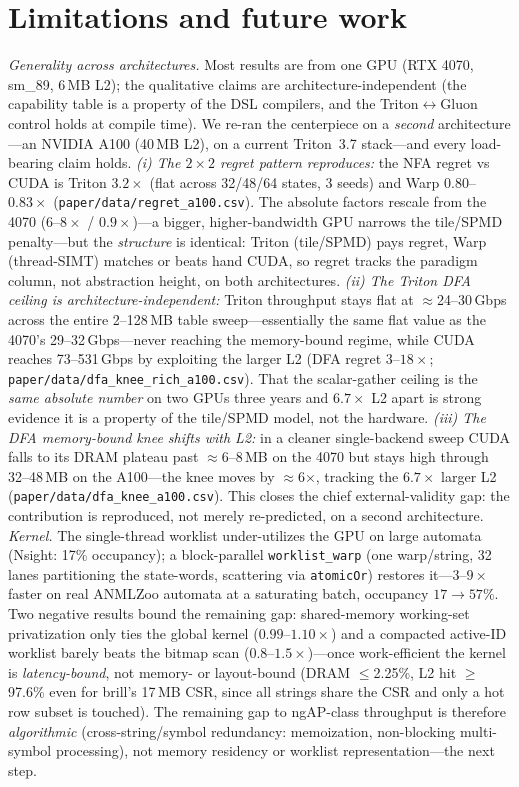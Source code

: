 \documentclass[conference]{IEEEtran}
\begin{document}
\section{Limitations and future work}\label{sec:limits}
\emph{Generality across architectures.} Most results are from one GPU (RTX 4070, sm\_89,
6\,MB L2); the qualitative claims are architecture-independent (the capability table is a
property of the DSL compilers, and the Triton$\leftrightarrow$Gluon control holds at compile
time). We re-ran the centerpiece on a \emph{second} architecture---an NVIDIA A100 (40\,MB L2),
on a current Triton~3.7 stack---and every load-bearing claim holds. \emph{(i) The $2\times2$
regret pattern reproduces:} the NFA regret vs CUDA is Triton $3.2\times$ (flat across 32/48/64
states, 3 seeds) and Warp $0.80$--$0.83\times$ (\texttt{paper/data/regret\_a100.csv}). The
absolute factors rescale from the 4070 ($6$--$8\times$ / $0.9\times$)---a bigger,
higher-bandwidth GPU narrows the tile/SPMD penalty---but the \emph{structure} is identical:
Triton (tile/SPMD) pays regret, Warp (thread-SIMT) matches or beats hand CUDA, so regret tracks
the paradigm column, not abstraction height, on both architectures. \emph{(ii) The Triton DFA
ceiling is architecture-independent:} Triton throughput stays flat at $\approx$24--30\,Gbps
across the entire 2--128\,MB table sweep---essentially the same flat value as the 4070's
29--32\,Gbps---never reaching the memory-bound regime, while CUDA reaches 73--531\,Gbps by
exploiting the larger L2 (DFA regret $3$--$18\times$; \texttt{paper/data/dfa\_knee\_rich\_a100.csv}).
That the scalar-gather ceiling is the \emph{same absolute number} on two GPUs three years and
$6.7\times$ L2 apart is strong evidence it is a property of the tile/SPMD model, not the hardware.
\emph{(iii) The DFA memory-bound knee shifts with L2:} in a cleaner single-backend sweep CUDA
falls to its DRAM plateau past $\approx$6--8\,MB on the 4070 but stays high through 32--48\,MB on
the A100---the knee moves by $\approx$6$\times$, tracking the $6.7\times$ larger L2
(\texttt{paper/data/dfa\_knee\_a100.csv}). This closes the chief external-validity gap: the
contribution is reproduced, not merely re-predicted, on a second architecture.
\emph{Kernel.} The single-thread worklist under-utilizes the GPU on large automata (Nsight:
17\% occupancy); a block-parallel \texttt{worklist\_warp} (one warp/string, 32 lanes
partitioning the state-words, scattering via \texttt{atomicOr}) restores it---$3$--$9\times$
faster on real ANMLZoo automata at a saturating batch, occupancy $17\!\rightarrow\!57\%$. Two
negative results bound the remaining gap: shared-memory working-set privatization only ties the
global kernel ($0.99$--$1.10\times$) and a compacted active-ID worklist barely beats the bitmap
scan ($0.8$--$1.5\times$)---once work-efficient the kernel is \emph{latency-bound}, not memory-
or layout-bound (DRAM $\le$2.25\%, L2 hit $\ge$97.6\% even for brill's 17\,MB CSR, since all
strings share the CSR and only a hot row subset is touched). The remaining gap to ngAP-class
throughput is therefore \emph{algorithmic} (cross-string/symbol redundancy: memoization,
non-blocking multi-symbol processing), not memory residency or worklist representation---the
next step.
\end{document}
